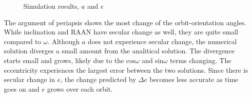 \documentclass[]{aiaa-tc}%
\begin{document}
	\begin{figure}[H]
		\centering
	\caption{Simulation results,  $a$ and $e$}
		\label{fig:P15_ae}

	\end{figure}

The argument of periapsis shows the most change of the orbit-orientation angles. While inclination and RAAN have secular change as well, they are quite small compared to $\omega$. Although $a$ does not experience secular change, the numerical solution diverges a small amount from the analitical solution. The divergence starts small and grows, likely due to the cos$\omega$ and sin$\omega$ terms changing. The eccentricity experiences the largest error between the two solutions. Since there is secular change in $e$, the change predicted by $\Delta e$ becomes less accurate as time goes on and $e$ grows over each orbit.
\end{document}

